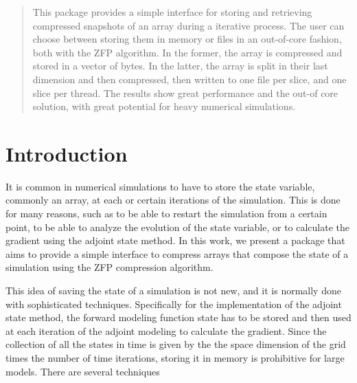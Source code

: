 \documentclass{juliacon}
\begin{document}


\maketitle

\begin{abstract}

This package provides a simple interface for storing and retrieving compressed snapshots of an array during a iterative process.
The user can choose between storing them in memory or files in an out-of-core fashion, both with the ZFP algorithm.
In the former, the array is compressed and stored in a vector of bytes.
In the latter, the array is split in their last dimension and then compressed, then written to one file per slice, and one slice per thread.
The results show great performance and the out-of core solution, with great potential for heavy numerical simulations.

\end{abstract}

\section{Introduction}

It is common in numerical simulations to have to store the state variable, commonly an array, at each or certain iterations of the simulation. This is done for many reasons, such as to be able to restart the simulation from a certain point, to be able to analyze the evolution of the state variable, or to calculate the gradient using the adjoint state method. In this work, we present a package that aims to provide a simple interface to compress arrays that compose the state of a simulation using the ZFP compression algorithm.

This idea of saving the state of a simulation is not new, and it is normally done with sophisticated techniques.
Specifically for the implementation of the adjoint state method, the forward modeling function state has to be stored and then used at each iteration of the adjoint modeling to calculate the gradient. Since the collection of all the states in time is given by the the space dimension of the grid times the number of time iterations, storing it in memory is prohibitive for large models. There are several techniques
\end{document}
